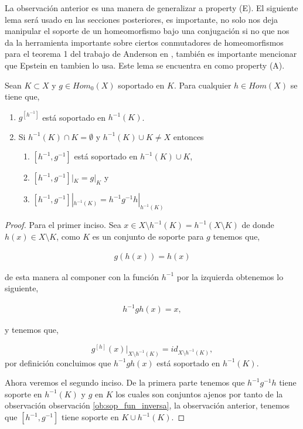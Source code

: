  
 La observación anterior es una manera de generalizar a \cite{ander} property (E). El siguiente lema será usado en las secciones posteriores, es importante, no solo nos deja manipular el soporte de un homeomorfismo bajo una conjugación si no que nos da la herramienta importante sobre ciertos conmutadores de homeomorfismos para el teorema 1 del trabajo de Anderson en \cite{ander}, también es importante mencionar que Epstein en \cite{epst} tambien lo usa. Este lema se encuentra en \cite{ander} como property (A).

\begin{lm}\label{lm:obs_A}
Sean $K \subset X$ y $g \in Hom_0(X)$ soportado en $K$. Para cualquier $h \in Hom(X)$ se tiene que,
 
	\begin{enumerate}
	\item  $g^{[h^{-1}]}$ está soportado en $h^{-1}(K)$.
	\item Si $h^{-1}(K) \cap K = \emptyset$ y $h^{-1}(K) \cup K \neq X$  entonces
		\begin{enumerate}
		\item $[h^{-1},g^{-1}]$ está soportado en $h^{-1}(K) \cup K$,
		\item $[h^{-1},g^{-1}]|_K=g|_K$ y 
		\item $[h^{-1},g^{-1}]|_{h^{-1}(K)}=h^{-1}g^{-1}h|_{h^{-1}(K)}$
		\end{enumerate}	
	\end{enumerate}
\end{lm}
	
\begin{proof}
Para el primer inciso. Sea $x \in X \setminus h^{-1}(K)= h^{-1}( X \setminus K)$ de donde $h(x) \in X \setminus K$, como $K$  es un conjunto de soporte para $g$ tenemos que,

\begin{align*}
g(h(x))=h(x)
\end{align*}

de esta manera al componer con la función $h^{-1}$ por la izquierda obtenemos lo siguiente,

	\begin{align*}
	h^{-1}gh(x)=x,
	\end{align*}

 y tenemos que, 
 
 $$g^{[h]}(x)|_{X \setminus h^{-1}(K)}=id_{X \setminus h^{-1}(K)},$$ 
por definición concluimos que $h^{-1}gh(x)$ está soportado en $h^{-1}(K).$

Ahora veremos el segundo inciso. De la primera parte tenemos que $h^{-1}g^{-1}h$ tiene soporte en $h^{-1}(K)$ y $g$ en $K$ los cuales son conjuntos ajenos por tanto de la observación observación \ref{ob:sop_fun_inversa}, la observación anterior, tenemos que $[h^{-1},g^{-1}]$ tiene soporte en $K \cup h^{-1}(K).$
   
\end{proof}




